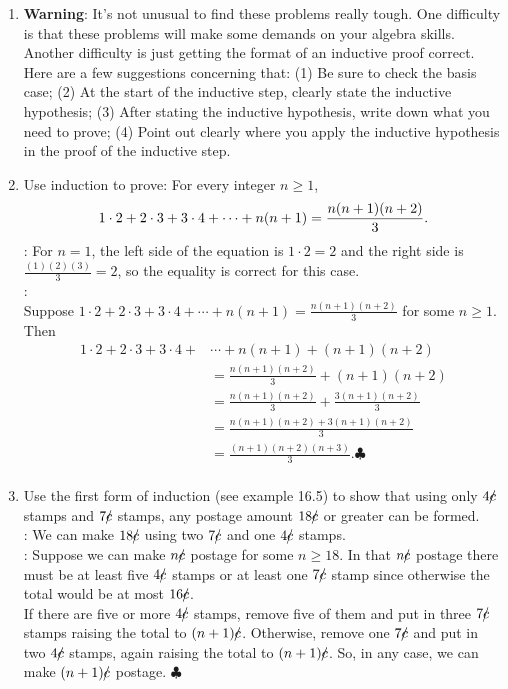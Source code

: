\documentclass[11pt]{amsart}
\begin{document}
\begin{enumerate}

\item[]
{\small {\bf Warning}: It's not unusual to find these problems really tough. One difficulty is that these problems will make some demands on your algebra skills. Another difficulty is just getting the format of an inductive proof correct.  Here are a few suggestions concerning that: (1)
Be sure to check the basis case; (2) At the start of the inductive step, clearly state the inductive hypothesis;
(3) After stating the inductive hypothesis, write down what you need to prove; (4) Point out clearly where you
apply the inductive hypothesis in the proof of the inductive step.}\\[3pt] 


\item Use induction to prove: For every integer $n\geq 1$,
\[
1\cdot 2+ 2\cdot 3+3\cdot4+\cdots+n(n+1) = \frac{n(n+1)(n+2)}{3}.\\[3pt]
\]
{\color{blue}
: For $n=1$, the left side of the equation is $1\cdot 2 = 2$ and the right side is
$\frac{(1)(2)(3)}{3} = 2$, so the equality is correct for this case.\\[2pt]
:\\ Suppose  $\displaystyle 1\cdot 2+ 2\cdot 3+3\cdot4+\cdots+n(n+1) = \frac{n(n+1)(n+2)}{3}$ for some $n\geq 1$. Then
\begin{align*}
1\cdot 2+ 2\cdot 3+3\cdot4+&\cdots+n(n+1) +(n+1)(n+2)\\[2pt]
&= \frac{n(n+1)(n+2)}{3} +(n+1)(n+2)\\[2pt]
& = \frac{n(n+1)(n+2)}{3} +\frac{3(n+1)(n+2)}{3}\\[2pt] 
& = \frac{n(n+1)(n+2) +3(n+1)(n+2)}{3}\\[2pt]
& = \frac{(n+1)(n+2)(n+3)}{3}.\clubsuit\\[5pt]
\end{align*}
}


\item  Use the first form of induction (see example 16.5) to show that using only $4 c\kern -5pt/$ stamps and  $7c\kern -5pt/$ stamps,
any postage amount $18c\kern -5pt/$ or greater can be formed.\\[3pt]
{\color{blue}
: We can make $18c\kern -5pt/$ using two $7c\kern -5pt/$ and one $4c\kern -5pt/$ stamps.\\[2pt]
: Suppose we can make $n c\kern -5pt/$ postage for some $n\geq 18$.
In that $n c\kern -5pt/$ postage there must be  at least five $4c\kern -5pt/$ stamps or at least one $7c\kern -5pt/$ stamp since otherwise the total would be at most $16c\kern -5pt/$.\\[2pt]
If there are five or more $4c\kern -5pt/$ stamps, remove five of them and put in three $7c\kern -5pt/$ stamps raising the total to $(n+1)c\kern -5pt/$. Otherwise,
remove one $7c\kern -5pt/$ and put in two $4c\kern -5pt/$ stamps, again raising the total to $(n+1)c\kern -5pt/$. So, in any case,  we can make $(n+1)c\kern -5pt/$ postage. $\clubsuit$\\[5pt]
} 



\end{enumerate}
\end{document}
